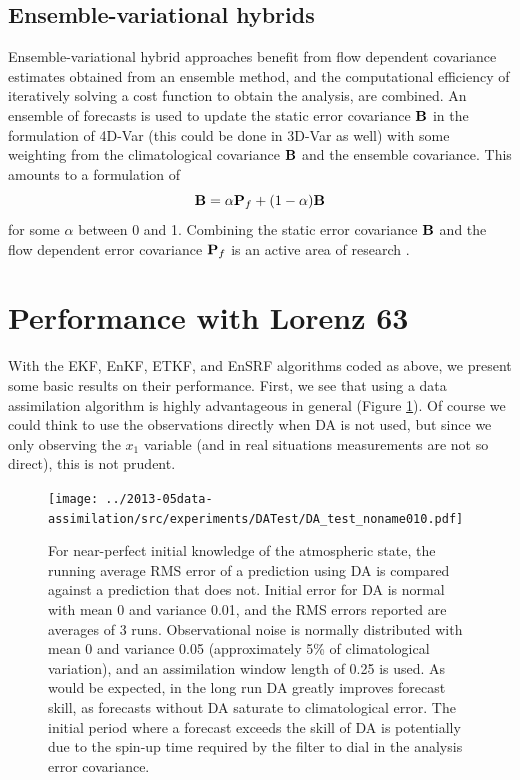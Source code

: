 \documentclass[12pt]{report}
\begin{document}
\subsection{Ensemble-variational hybrids}

Ensemble-variational hybrid approaches benefit from flow dependent covariance estimates obtained from an ensemble method, and the computational efficiency of iteratively solving a cost function to obtain the analysis, are combined.
An ensemble of forecasts is used to update the static error covariance $\mathbf{B}$ in the formulation of 4D-Var (this could be done in 3D-Var as well) with some weighting from the climatological covariance $\mathbf{B}$ and the ensemble covariance.
This amounts to a formulation of
\begin{equation} \mathbf{B} = \alpha \mathbf{P}_f + (1-\alpha) \mathbf{B} \end{equation}
for some $\alpha$ between 0 and 1.
Combining the static error covariance $\mathbf{B}$ and the flow dependent error covariance $\mathbf{P}_f$ is an active area of research .

\section{Performance with Lorenz 63}

With the EKF, EnKF, ETKF, and EnSRF algorithms coded as above, we present some basic results on their performance. 
First, we see that using a data assimilation algorithm is highly advantageous in general (Figure \ref{fig:DA_test}).
Of course we could think to use the observations directly when DA is not used, but since we only observing the $x_1$ variable (and in real situations measurements are not so direct), this is not prudent.

\begin{figure}[h!]
  \centering
  \texttt{[image: ../2013-05data-assimilation/src/experiments/DATest/DA\_test\_noname010.pdf]}
  \caption[For near-perfect initial knowledge of the atmospheric state, the running average RMS error of a prediction using DA is compared against a prediction that does not]{
    For near-perfect initial knowledge of the atmospheric state, the running average RMS error of a prediction using DA is compared against a prediction that does not.
    Initial error for DA is normal with mean 0 and variance 0.01, and the RMS errors reported are averages of 3 runs.
    Observational noise is normally distributed with mean 0 and variance 0.05 (approximately 5\% of climatological variation), and an assimilation window length of 0.25 is used.
    As would be expected, in the long run DA greatly improves forecast skill, as forecasts without DA saturate to climatological error.
    The initial period where a forecast exceeds the skill of DA is potentially due to the spin-up time required by the filter to dial in the analysis error covariance.
  }
  \label{fig:DA_test}
\end{figure}
\end{document}
